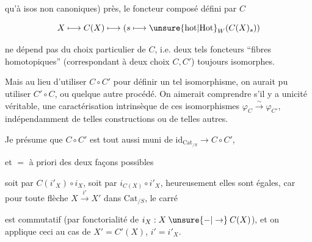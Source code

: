 qu'à isos  non canoniques) près, le foncteur composé défini par $C$

\[
X\longmapsto C(X)\longmapsto (s\longmapsto\unsure{\mathrm{hot}|\mathrm{Hot}}_W(C(X)_s))
\]


ne dépend pas du choix particulier de $C$, i.e. deux tels foncteurs ``fibres homotopiques'' (correspondant à deux choix $C,C'$)  toujours isomorphes.

Mais au lieu d'utiliser $C\circ C'$ pour définir un tel isomorphisme, on aurait pu utiliser $C'\circ C$, ou quelque autre procédé. On aimerait comprendre s'il y a unicité véritable, une caractérisation intrinsèque de ces isomorphismes $\varphi_C\xrightarrow{\sim}\varphi_{C'}$, indépendamment de telles constructions ou de telles autres.

Je présume que $C\circ C'$ est tout aussi muni de $\mathrm{id}_{\mathrm{Cat}_{/S}}\longrightarrow C\circ C'$,

et $=$ à priori des deux façons possibles


soit par $C(i'_X)\circ i_X$, soit par $i_{C(X)}\circ i'_X$, heureusement elles sont égales, car pour toute flèche $X\xrightarrow{i'}X'$ dans $\mathrm{Cat}_{/S}$, le carré


est commutatif (par fonctorialité de $i_X:X\mathbin{\unsure{-|\to}}C(X)$), et on applique ceci au cas de $X'=C'(X)$, $i'=i'_X$. 

